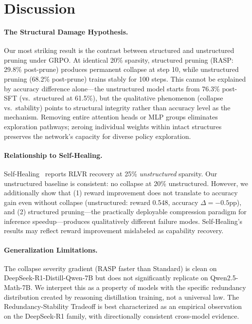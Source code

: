 \documentclass[11pt,a4paper]{article}
\begin{document}
\section{Discussion}

\paragraph{The Structural Damage Hypothesis.} Our most striking result is the contrast between structured and unstructured pruning under GRPO. At identical 20\% sparsity, structured pruning (RASP: 29.8\% post-prune) produces permanent collapse at step 10, while unstructured pruning (68.2\% post-prune) trains stably for 100 steps. This cannot be explained by accuracy difference alone---the unstructured model starts from 76.3\% post-SFT (vs.\ structured at 61.5\%), but the qualitative phenomenon (collapse vs.\ stability) points to structural integrity rather than accuracy level as the mechanism. Removing entire attention heads or MLP groups eliminates exploration pathways; zeroing individual weights within intact structures preserves the network's capacity for diverse policy exploration.

\paragraph{Relationship to Self-Healing.} Self-Healing~\cite{self-healing-2025} reports RLVR recovery at 25\% \emph{unstructured} sparsity. Our unstructured baseline is consistent: no collapse at 20\% unstructured. However, we additionally show that (1) reward improvement does not translate to accuracy gain even without collapse (unstructured: reward 0.548, accuracy $\Delta = -0.5$pp), and (2) structured pruning---the practically deployable compression paradigm for inference speedup---produces qualitatively different failure modes. Self-Healing's results may reflect reward improvement mislabeled as capability recovery.

\paragraph{Generalization Limitations.} The collapse severity gradient (RASP faster than Standard) is clean on DeepSeek-R1-Distill-Qwen-7B but does not significantly replicate on Qwen2.5-Math-7B. We interpret this as a property of models with the specific redundancy distribution created by reasoning distillation training, not a universal law. The Redundancy-Stability Tradeoff is best characterized as an empirical observation on the DeepSeek-R1 family, with directionally consistent cross-model evidence.
\end{document}
